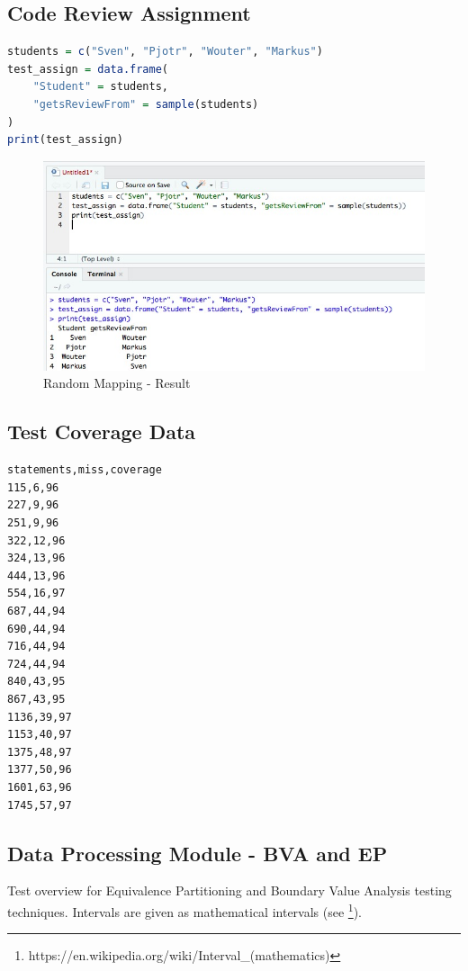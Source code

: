 \documentclass[a4paper]{article}
\begin{document}
\subsection{Code Review Assignment}
\label{appendix:review-assignment}
\begin{lstlisting}[language=R, caption=Random Mapping - R Code, captionpos=b]
students = c("Sven", "Pjotr", "Wouter", "Markus")
test_assign = data.frame(
    "Student" = students,
    "getsReviewFrom" = sample(students)
)
print(test_assign)
\end{lstlisting}

\begin{figure}[H]
\centering
    \includegraphics[scale=0.50]{figs/r-code.jpeg}
    \caption{Random Mapping - Result}
    \label{fig:mapping-result}
\end{figure}


\clearpage
\subsection{Test Coverage Data}
\label{appendix:test-coverage-data}
\begin{lstlisting}[caption=Test coverage data, captionpos=b]
statements,miss,coverage
115,6,96
227,9,96
251,9,96
322,12,96
324,13,96
444,13,96
554,16,97
687,44,94
690,44,94
716,44,94
724,44,94
840,43,95
867,43,95
1136,39,97
1153,40,97
1375,48,97
1377,50,96
1601,63,96
1745,57,97
\end{lstlisting}

\clearpage
\subsection{Data Processing Module - BVA and EP}
\label{appendix:bva}
Test overview for Equivalence Partitioning and Boundary Value Analysis testing techniques. Intervals are given as mathematical intervals (see \footnote{https://en.wikipedia.org/wiki/Interval\_(mathematics)}).
\end{document}
